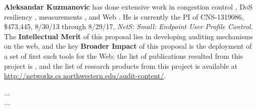 

{\bf Aleksandar Kuzmanovic} has done extensive work in 
congestion control \cite{ecn05sigcomm,ecn05rfc,web06par,tcp-lp,tcp-lpToN,hstcp-lp,extr08ccr},
DoS resiliency \cite{receiver07jcn,friendly07infocom,dos05p2p,cache06icnp,tcpoison07icnp,shrew03sigcomm,shrewToN,aj08imc,adver10infocom},
measurements \cite{akamai06sigcomm,pong07sigmetrics,pong08icnp,KuzKni01,kuzkni-tpds,akamai08icdcs,aj08imc,google08sigcomm,serendipity09imc,p2p10infocom,geo11nsdi}, and Web \cite{geo11nsdi,migration11wi,spam13pam,selective12wi,adver11icdcs,myths10wi,ad10www,ad10infocom,myths14tweb,synthoid14wi,geoecho14wi,mosaic13sigcomm,glance13wow,fusion11,fusion13,move12www,vision12}.
He is currently the PI of CNS-1319086, \$473,445, 8/30/13 through 8/29/17, \emph{NetS: Small: Endpoint User Profile Control}. The \textbf{Intellectual Merit} of this proposal lies in developing auditing mechanisms on the web, and the key
\textbf{Broader Impact} of this proposal is the deployment of a set of first such tools for the Web; the list of publications resulted from this project is \cite{spam13pam,migration11wi,selective12wi,adver11icdcs,myths10wi,ad10www,ad10infocom,myths14tweb}, and the list of research products from this project is available at \url{http://networks.cs.northwestern.edu/audit-content/}.

...\\

...\\
